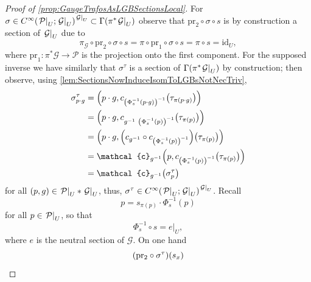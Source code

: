\documentclass[reqno,a4paper,oneside]{amsart}
\theoremstyle{plain}
\theoremstyle{remark}
\theoremstyle{definition}
\begin{document}
\begin{proof}[Proof of \ref{prop:GaugeTrafosAsLGBSectionsLocal}]
\leavevmode\newline
For $\sigma \in C^\infty \mleft( \mleft.\mathcal{P}\mright|_U; \mleft.\mathcal{G}\mright|_U \mright)^{\mleft.\mathcal{G}\mright|_U} \subset \Gamma\mleft( \pi^*\mleft.\mathcal{G}\mright|_U \mright)$ observe that $\mathrm{pr}_2 \circ \sigma \circ s$ is by construction a section of $\mleft.\mathcal{G}\mright|_U$ due to 
\begin{equation*}
\pi_{\mathcal{G}} \circ \mathrm{pr}_2 \circ \sigma \circ s
=
\pi \circ \mathrm{pr}_1 \circ \sigma \circ s
=
\pi \circ s
=
\mathrm{id}_U,
\end{equation*}
where $\mathrm{pr}_1\colon \pi^*\mathcal{G} \to \mathcal{P}$ is the projection onto the first component.
For the supposed inverse we have similarly that $\sigma^\tau$ is a section of $\Gamma(\pi^*\mleft.\mathcal{G}\mright|_U)$ by construction; then observe, using \ref{lem:SectionsNowInduceIsomToLGBsNotNecTriv},
\begin{align*}
\sigma_{p \cdot g}^\tau
&=
\mleft(p \cdot g, c_{\mleft(\Phi^{-1}_{s}(p \cdot g)\mright)^{-1}} \mleft( \tau_{\pi(p \cdot g)} \mright) \mright)
\\
&=
\mleft(p \cdot g, c_{g^{-1} ~ \mleft(\Phi^{-1}_{s}(p)\mright)^{-1}} \mleft( \tau_{\pi(p)} \mright) \mright)
\\
&=
\mleft(p \cdot g, \mleft(c_{g^{-1}} \circ c_{ \mleft(\Phi^{-1}_{s}(p)\mright)^{-1}} \mright) \mleft( \tau_{\pi(p)} \mright) \mright)
\\
&=
\mathcal{c}_{g^{-1}}
\mleft(p, c_{ \mleft(\Phi^{-1}_{s}(p)\mright)^{-1}} \mleft( \tau_{\pi(p)} \mright) \mright)
\\
&=
\mathcal{c}_{g^{-1}}
\mleft( \sigma^\tau_p \mright)
\end{align*}
for all $(p, g) \in \mleft.\mathcal{P}\mright|_U * \mleft.\mathcal{G}\mright|_U$, thus, $\sigma^\tau \in C^\infty \mleft( \mleft.\mathcal{P}\mright|_U; \mleft.\mathcal{G}\mright|_U \mright)^{\mleft.\mathcal{G}\mright|_U}$. Recall
\begin{equation*}
p = s_{\pi(p)} \cdot \Phi^{-1}_s(p)
\end{equation*} 
for all $p \in \mleft.\mathcal{P}\mright|_U$,
so that
\begin{equation*}
\Phi^{-1}_{s} \circ s
=
e|_U,
\end{equation*}
where $e$ is the neutral section of $\mathcal{G}$. On one hand
\begin{equation*}
\mleft(\mathrm{pr_2} \circ \sigma^\tau\mright)(s_x)

\end{equation*}
\end{proof}
\end{document}
